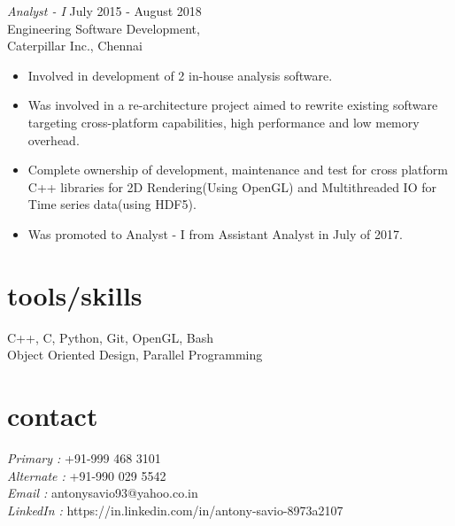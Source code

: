 \documentclass[margin]{res}
\begin{document}
\begin{resume}
    {\sl Analyst - I} \hfill July 2015 - August 2018\\
        Engineering Software Development,\\
        Caterpillar Inc., Chennai 
        \begin{itemize}  \itemsep -2pt 
            \item Involved in development of 2 in-house analysis software. 
            \item Was involved in a re-architecture project aimed to rewrite existing software
             targeting cross-platform capabilities, high performance and low memory overhead.
            \item Complete ownership of development, maintenance and test for cross platform 
            C++ libraries for 2D Rendering(Using OpenGL) and Multithreaded IO
             for Time series data(using HDF5).
            \item Was promoted to Analyst - I from Assistant Analyst in July of 2017.
        \end{itemize}
                
        
		
\section{tools/skills}  
    C++, C, Python, Git, OpenGL, Bash\\
    Object Oriented Design, Parallel Programming
            
\section{contact}
    {\sl Primary :}
    +91-999 468 3101 \\
    {\sl Alternate :}
    +91-990 029 5542 \\
    {\sl Email :}
    antonysavio93@yahoo.co.in \\
    {\sl LinkedIn :}
    https://in.linkedin.com/in/antony-savio-8973a2107 \\ 

\end{resume}
\end{document}
